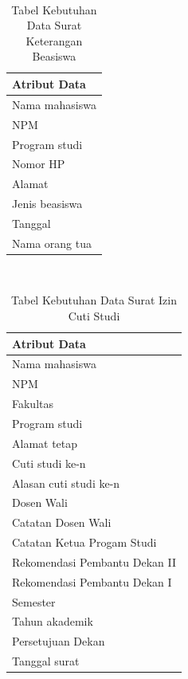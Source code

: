 \
\begin{table}[H]
\centering
\caption{Tabel Kebutuhan Data Surat Keterangan Beasiswa}
\label{surat_keterangan_beasiswa}
\begin{tabular}{|l|}
\hline
{\textbf{Atribut Data}}                     \\ \hline
{Nama mahasiswa}                            \\ \hline 
{NPM}                                       \\ \hline 
{Program studi}                             \\ \hline
{Nomor HP}			                            \\ \hline
{Alamat}        			                     	\\ \hline
{Jenis beasiswa}                            \\ \hline 
{Tanggal}                                   \\ \hline 
{Nama orang tua}                            \\ \hline
\end{tabular}
\end{table}
\
\begin{table}[H]
\centering
\caption{Tabel Kebutuhan Data Surat Izin Cuti Studi}
\label{surat_izin_cuti_studi}
\begin{tabular}{|l|}
\hline
{\textbf{Atribut Data}}                     \\ \hline
{Nama mahasiswa}                            \\ \hline 
{NPM}                                       \\ \hline 
{Fakultas}                                  \\ \hline 
{Program studi}                             \\ \hline 
{Alamat tetap}                              \\ \hline
{Cuti studi ke-n}   			                	\\ \hline 
{Alasan cuti studi ke-n}                    \\ \hline
{Dosen Wali}				                        \\ \hline 
{Catatan Dosen Wali}                        \\ \hline
{Catatan Ketua Progam Studi}                \\ \hline 
{Rekomendasi Pembantu Dekan II}             \\ \hline 
{Rekomendasi Pembantu Dekan I}              \\ \hline 
{Semester}                          		    \\ \hline 
{Tahun akademik}                            \\ \hline
{Persetujuan Dekan}                         \\ \hline 
{Tanggal surat}                             \\ \hline
\end{tabular}
\end{table}
